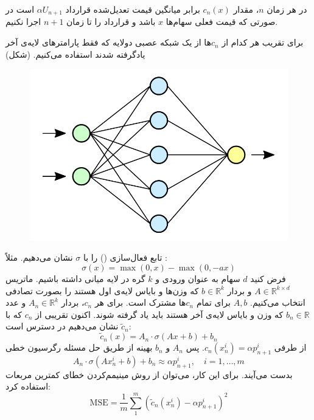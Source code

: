 \documentclass[hidelinks, 11pt]{article}
\begin{document}
در هر زمان \(n\)، مقدار \(c_{n}(x)\) برابر میانگین قیمت تعدیل‌شده قرارداد
\(\alpha U_{n+1}\) است در صورتی که قیمت فعلی سهام‌ها \(x\) باشد و قرارداد
را تا زمان \(n+1\) اجرا نکنیم.

برای تقریب هر کدام از \(c_{n}\)ها از یک شبکه عصبی دولایه که فقط پارامترهای
لایه‌ی آخر یادگرفته شدند استفاده می‌کنیم. (شکل)

\begin{figure}[htbp]
  \centering
  \includegraphics[scale=0.3]{Neural_network.png}
\end{figure}

تابع فعال‌سازی () را با \(\sigma\) نشان
می‌دهیم. مثلاً :
\begin{equation*}
	\sigma(x)=\max(0,x)-\max(0,-ax)
\end{equation*}
فرض کنید \(d\) سهام به عنوان ورودی و \(k\) گره در لایه میانی داشته
باشیم.  ماتریس \(A\in\mathbb{R}^{k\times d}\) و بردار
\(b\in\mathbb{R}^{k}\) که وزن‌ها و بایاس لایه‌ی اول هستند را بصورت تصادفی
انتخاب می‌کنیم.  \(A,b\) برای تمام \(c_{n}\)ها مشترک است.  برای هر
\(c_{n}\)، بردار \(A_{n}\in\mathbb{R}^{k}\) و عدد \(b_{n}\in\mathbb{R}\)
که وزن و بایاس لایه‌ی آخر هستند باید یاد گرفته شوند.  اکنون تقریبی از
\(c_{n}\) که با \(\widetilde{c}_{n}\) نشان می‌دهیم در دسترس است:
\begin{equation}
	\label{c:nn}
	\widetilde{c}_{n}(x) = A_{n} \cdot \sigma (Ax+b) + b_{n}
\end{equation}
از طرفی \(c_{n}(x_{n}^{i})=\alpha p_{n+1}^{i}\).  پس \(A_{n}\) و
\(b_{n}\) بهینه از طریق حل مسئله رگرسیون خطی
\begin{equation}
	\label{mc:reg}
	A_{n} \cdot \sigma (Ax_{n}^{i}+b) + b_{n}
	  \approx \alpha p_{n+1}^{i},    \quad i=1,\dots,m
\end{equation}
بدست می‌آیند.  برای این کار، می‌توان از روش مینیمم‌کردن خطای کمترین مربعات
استفاده کرد:
\begin{equation*}
	\mathrm{MSE} =
	  \frac{1}{m} \sum_{1}^{m}
	     \left( \widetilde{c}_{n}(x_{n}^{i})-\alpha p_{n+1}^{i} \right)^{2}
\end{equation*}
\end{document}
